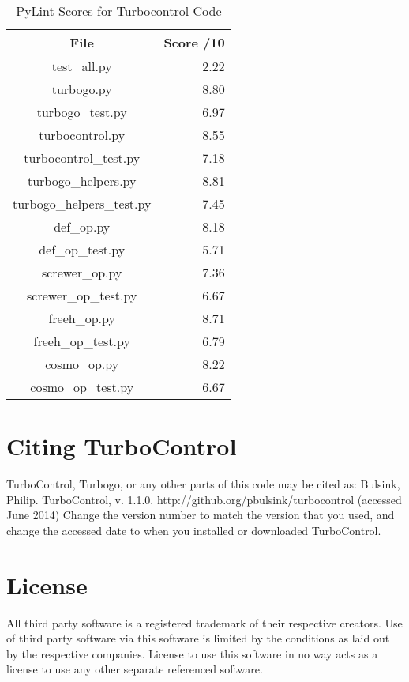 \begin{table}[!h]
  \centering
  \caption{PyLint Scores for Turbocontrol Code}
    \begin{tabular}{cr}
    \toprule
    File  & Score /10 \\
    \midrule
    test\_all.py & 2.22 \\
    turbogo.py & 8.80 \\
    turbogo\_test.py & 6.97 \\
    turbocontrol.py & 8.55 \\
    turbocontrol\_test.py & 7.18 \\
    turbogo\_helpers.py & 8.81 \\
    turbogo\_helpers\_test.py & 7.45 \\
    def\_op.py & 8.18 \\
    def\_op\_test.py & 5.71 \\
    screwer\_op.py & 7.36 \\
    screwer\_op\_test.py & 6.67 \\
    freeh\_op.py & 8.71 \\
    freeh\_op\_test.py & 6.79 \\
    cosmo\_op.py & 8.22 \\
    cosmo\_op\_test.py & 6.67 \\
    \bottomrule
    \end{tabular}%
  \label{tab.pylint}
\end{table}%

\section{Citing TurboControl}

TurboControl, Turbogo, or any other parts of this code may be cited as:
Bulsink, Philip. TurboControl, v. 1.1.0. http://github.org/pbulsink/turbocontrol (accessed June 2014)
Change the version number to match the version that you used, and change the accessed date to when you installed or downloaded TurboControl. 


\section{License}

All third party software is a registered trademark of their respective
creators. Use of third party software via this software is limited by
the conditions as laid out by the respective companies. License to use
this software in no way acts as a license to use any other separate
referenced software.

